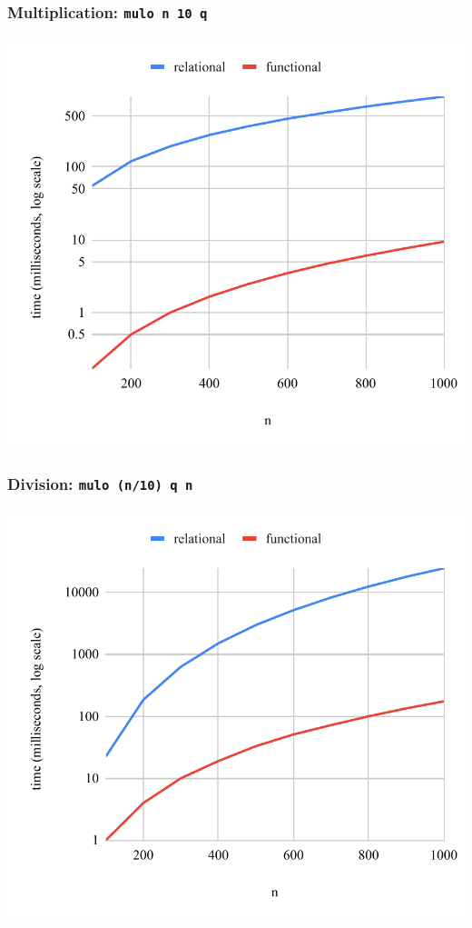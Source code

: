 \documentclass[xcolor=table, aspectratio=169]{beamer}
\begin{document}
\begin{frame}[fragile]
  \frametitle{Multiplication: \lstinline[basicstyle=\Large]{mulo n 10 q}}
  \begin{center}
    \includegraphics[height=0.85\textheight]{figures/muloIIO.pdf}
  \end{center}
\end{frame}


\begin{frame}[fragile]
  \frametitle{Division: \lstinline[basicstyle=\Large]{mulo (n/10) q n}}
  \begin{center}
    \includegraphics[height=0.85\textheight]{figures/muloIOI.pdf}
  \end{center}
\end{frame}
\end{document}
